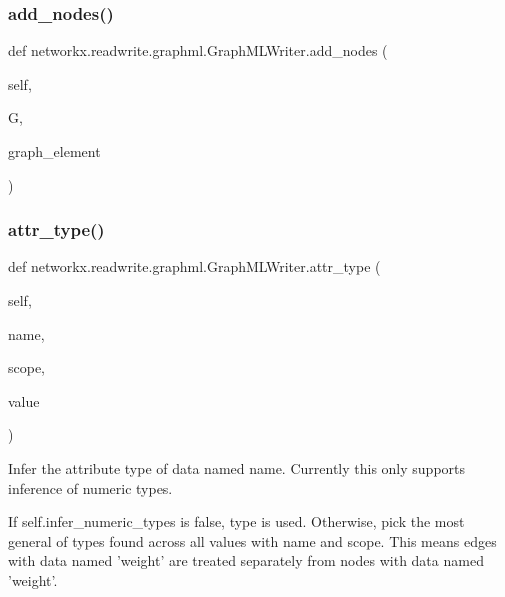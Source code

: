 \subsubsection{\texorpdfstring{add\+\_\+nodes()}{add\_nodes()}}
{\footnotesize\ttfamily def networkx.\+readwrite.\+graphml.\+Graph\+M\+L\+Writer.\+add\+\_\+nodes (\begin{DoxyParamCaption}\item[{}]{self,  }\item[{}]{G,  }\item[{}]{graph\+\_\+element }\end{DoxyParamCaption})}

\mbox{\label{classnetworkx_1_1readwrite_1_1graphml_1_1GraphMLWriter_ae10301046808668379b99e2c7efe1ab7}} 
\subsubsection{\texorpdfstring{attr\+\_\+type()}{attr\_type()}}
{\footnotesize\ttfamily def networkx.\+readwrite.\+graphml.\+Graph\+M\+L\+Writer.\+attr\+\_\+type (\begin{DoxyParamCaption}\item[{}]{self,  }\item[{}]{name,  }\item[{}]{scope,  }\item[{}]{value }\end{DoxyParamCaption})}

\begin{DoxyVerb}Infer the attribute type of data named name. Currently this only
supports inference of numeric types.

If self.infer_numeric_types is false, type is used. Otherwise, pick the
most general of types found across all values with name and scope. This
means edges with data named 'weight' are treated separately from nodes
with data named 'weight'.
\end{DoxyVerb}
 \mbox{\label{classnetworkx_1_1readwrite_1_1graphml_1_1GraphMLWriter_a39d8a5d345f7abedfdb5c66baa3695f0}} 
